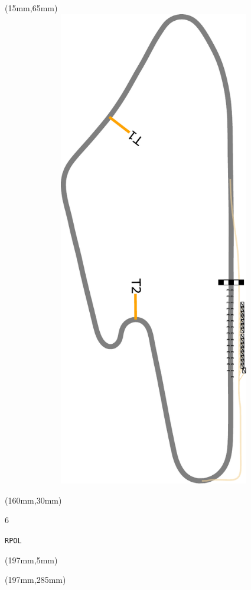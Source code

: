 \begin{textblock*}{185mm}(15mm,65mm)%
\centering
\mbox{\includegraphics[width=185mm,height=210mm,keepaspectratio]{PT/RPOL.pdf}}
\end{textblock*}
\begin{textblock*}{40mm}(160mm,30mm)%
\Large
\par{} 
\par6 
\par\hfill\tiny\tt RPOL\\
\end{textblock*}
\begin{textblock*}{20mm}(197mm,5mm)%
\fbox{\thepage}
\label{RPOL}
\end{textblock*}
\begin{textblock*}{20mm}(197mm,285mm)%
\fbox{\thepage}
\end{textblock*}

